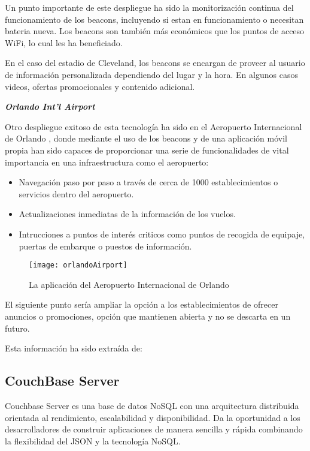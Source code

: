 Un punto importante de este  despliegue ha sido la monitorización continua del funcionamiento de los beacons, incluyendo si estan en funcionamiento o necesitan bateria nueva. Los beacons son también más económicos que los puntos de acceso WiFi, lo cual les ha beneficiado.

En el caso del estadio de Cleveland, los beacons se encargan de proveer al usuario de información personalizada dependiendo del lugar y la hora. En algunos casos videos, ofertas promocionales y contenido adicional.

\vspace{5mm}

\textsl{\textbf{{Orlando Int'l Airport}}}

\vspace{2mm}

Otro despliegue exitoso de esta tecnología ha sido en el Aeropuerto Internacional de Orlando , donde mediante el uso de los beacons y de una aplicación móvil propia han sido capaces de proporcionar una serie de funcionalidades de vital importancia en una infraestructura como el aeropuerto: 

\begin{itemize}
\item Navegación paso por paso a través de cerca de 1000 establecimientos o servicios dentro del aeropuerto. 
\item Actualizaciones inmediatas de la información de los vuelos. 
\item Intrucciones a puntos de interés criticos como puntos de recogida de equipaje, puertas de embarque o puestos de información.
\end{itemize}

\begin{figure}[H]
	\centering
	\texttt{[image: orlandoAirport]}
	\caption{La aplicación del Aeropuerto Internacional de Orlando}
	\label{fig:orlandoAirport}
\end{figure}

El siguiente punto sería ampliar la opción a los establecimientos de ofrecer anuncios o promociones, opción que mantienen abierta y no se descarta en un futuro.


Esta información ha sido extraída de: \cite{URL::Articulo} 

\subsection{CouchBase Server}

Couchbase Server es una base de datos NoSQL con una arquitectura distribuida orientada al rendimiento, escalabilidad y disponibilidad. Da la oportunidad a los desarrolladores de construir aplicaciones de manera sencilla y rápida combinando la flexibilidad del JSON y la tecnología NoSQL.

